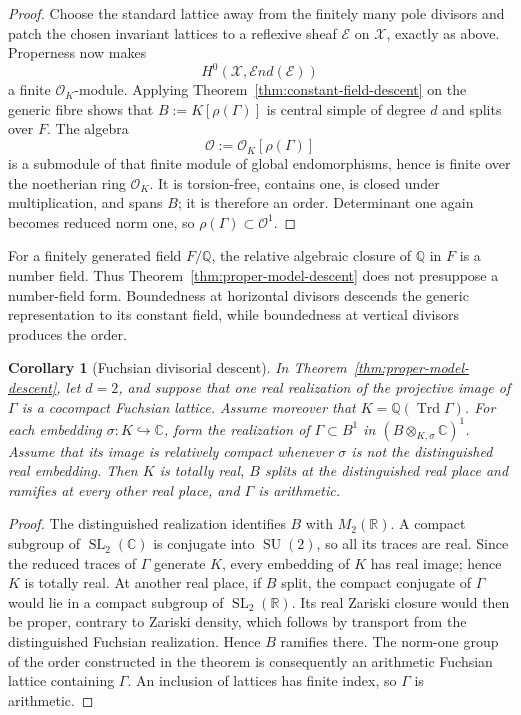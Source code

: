 \documentclass[11pt,reqno]{amsart}
\newtheorem{corollary}[theorem]{Corollary}
\theoremstyle{definition}
\theoremstyle{remark}
\newcommand{\R}{\mathbb R}
\newcommand{\C}{\mathbb C}
\newcommand{\Q}{\mathbb Q}
\newcommand{\cO}{\mathcal O}
\newcommand{\SL}{\operatorname{SL}}
\newcommand{\SU}{\operatorname{SU}}
\begin{document}
\begin{proof}
Choose the standard lattice away from the finitely many pole divisors and
patch the chosen invariant lattices to a reflexive sheaf \(\mathcal E\) on
\(\mathcal X\), exactly as above.  Properness now makes
\[
 H^0\!\left(\mathcal X,\mathcal End(\mathcal E)\right)
\]
a finite \(\cO_K\)-module.  Applying
Theorem~\ref{thm:constant-field-descent} on the generic fibre shows that
\(B:=K[\rho(\Gamma)]\) is central simple of degree \(d\) and splits over
\(F\).  The algebra
\[
 \cO:=\cO_K[\rho(\Gamma)]
\]
is a submodule of that finite module of global endomorphisms, hence is
finite over the noetherian ring \(\cO_K\).  It is torsion-free, contains
one, is closed under multiplication, and spans \(B\); it is therefore an
order.  Determinant one again becomes reduced norm one, so
\(\rho(\Gamma)\subset\cO^1\).
\end{proof}

For a finitely generated field \(F/\Q\), the relative algebraic closure of
\(\Q\) in \(F\) is a number field.  Thus
Theorem~\ref{thm:proper-model-descent} does not presuppose a number-field
form.  Boundedness at horizontal divisors descends the generic
representation to its constant field, while boundedness at vertical
divisors produces the order.

\begin{corollary}[Fuchsian divisorial descent]
\label{cor:fuchsian-divisorial-descent}
In Theorem~\ref{thm:proper-model-descent}, let \(d=2\), and suppose that one
real realization of the projective image of \(\Gamma\) is a cocompact
Fuchsian lattice.  Assume moreover that
\(K=\Q(\operatorname{Trd}\Gamma)\).  For each embedding
\(\sigma\colon K\hookrightarrow\C\), form the realization of
\(\Gamma\subset B^1\) in
\((B\otimes_{K,\sigma}\C)^1\).  Assume that its image is relatively compact
whenever \(\sigma\) is not the distinguished real embedding.  Then \(K\) is
totally real,
\(B\) splits at the distinguished real place and ramifies at every other
real place, and \(\Gamma\) is arithmetic.
\end{corollary}

\begin{proof}
The distinguished realization identifies \(B\) with \(M_2(\R)\).  A compact
subgroup of \(\SL_2(\C)\) is conjugate into \(\SU(2)\), so all its traces
are real.  Since the reduced traces of \(\Gamma\) generate \(K\), every
embedding of \(K\) has real image; hence \(K\) is totally real.  At another
real place, if \(B\) split, the compact conjugate of \(\Gamma\) would lie
in a compact subgroup of \(\SL_2(\R)\).  Its real Zariski closure would
then be proper, contrary to Zariski density, which follows by transport
from the distinguished Fuchsian realization.  Hence \(B\) ramifies there.
The norm-one group of the order constructed in the theorem is consequently an
arithmetic Fuchsian lattice containing \(\Gamma\).  An inclusion of
lattices has finite index, so \(\Gamma\) is arithmetic.
\end{proof}
\end{document}
